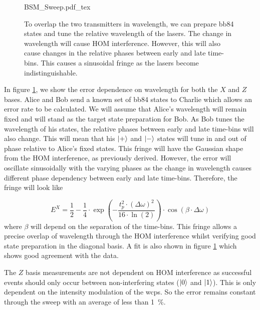 \begin{figure}[t]
	\centering
	\small
	\def\svgwidth{0.9\textwidth} 
	{BSM_Sweep.pdf_tex}
	\caption[Bell-state projection error against laser current]{To overlap the two transmitters in wavelength, we can prepare \acs{bb84} states and tune the relative wavelength of the lasers. The change in wavelength will cause \acs{HOM} interference. However, this will also cause changes in the relative phases between early and late time-bins. This causes a sinusoidal fringe as the lasers become indistinguishable.}
	\label{fig:wavelength_cal}
\end{figure}

In figure \ref{fig:wavelength_cal}, we show the error dependence on wavelength for both the $X$ and $Z$ bases. Alice and Bob send a known set of \ac{bb84} states to Charlie which allows an error rate to be calculated. We will assume that Alice's wavelength will remain fixed and will stand as the target state preparation for Bob. As Bob tunes the wavelength of his states, the relative phases between early and late time-bins will also change. This will mean that his $\ket{+}$ and $\ket{-}$ states will tune in and out of phase relative to Alice's fixed states. This fringe will have the Gaussian shape from the \ac{HOM} interference, as previously derived. However, the error will oscillate sinusoidally with the varying phases as the change in wavelength causes different phase dependency between early and late time-bins. Therefore, the fringe will look like

\begin{equation}
	E^X = \frac{1}{2} - \frac{1}{4} \cdot \exp\left(-\frac{t_p^2 \cdot(\Delta\omega)^2}{16 \cdot\ln(2)}\right) \cdot \cos(\beta \cdot\Delta\omega)
\end{equation}
where $\beta$ will depend on the separation of the time-bins. This fringe allows a precise overlap of wavelength through the \ac{HOM} interference whilst verifying good state preparation in the diagonal basis. A fit is also shown in figure \ref{fig:wavelength_cal} which shows good agreement with the data. 

The $Z$ basis measurements are not dependent on \ac{HOM} interference as successful events should only occur between non-interfering states ($\ket{0}$ and $\ket{1}$). This is only dependent on the intensity modulation of the \acp{wcp}. So the error remains constant through the sweep with an average of less than \SI{1}{\percent}.

